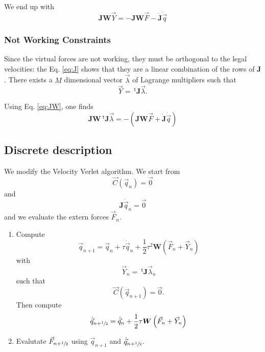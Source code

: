\documentclass[aps,twocolumn]{revtex4}
\newcommand{\mymat}[1]{\boldsymbol{#1}}
\newcommand{\mytrn}[1]{{\!\!~^{\mathsf{t}}{#1}}}
\newcommand{\half}{\sfrac{1}{2}}
\begin{document}
We end up with
\begin{equation}
\label{eq:JW}
	\mymat{J}\mymat{W}\vec{Y} = 
	-\mymat{J}\mymat{W}\vec{F} - \dot{\mymat{J}}\dot{\vec{q}}
\end{equation}

\subsubsection{Not Working Constraints}
Since the virtual forces are not working, they must be orthogonal to the legal velocities: the Eq. \eqref{eq:J}
shows that they are a linear combination of the rows of $\mymat{J}$.
There exists a $M$ dimensional vector $\vec{\lambda}$ 
of Lagrange multipliers
such that
\begin{equation}
	\vec{Y} = \mytrn{\mymat{J}}\vec{\lambda}.
\end{equation}

Using Eq. \eqref{eq:JW}, one finds
\begin{equation}
	\mymat{J}\mymat{W} \mytrn{\mymat{J}}\vec{\lambda} = -\left(\mymat{J}\mymat{W}\vec{F} + \dot{\mymat{J}}\dot{\vec{q}}\right)
\end{equation}

\subsection{Discrete description}

We modify the Velocity Verlet algorithm.
We start from
$$
	\vec{C}(\vec{q}_n)=\vec{0}  
$$
and
$$
 \mymat{J} \dot{\vec{q}}_n = \vec{0}
$$
and we evaluate the extern forces $\vec{F}_n$.

\begin{enumerate}
\item 
	Compute 
	$$
		\vec{q}_{n+1} = \vec{q}_{n} + \tau \dot{\vec{q}}_n + \dfrac{1}{2} \tau^2 \mymat{W}\left( \vec{F}_n + \vec{Y}_n\right)
	$$
	with 
	$$
		\vec{Y}_n = \mytrn{\mymat{J}}\vec{\lambda}_n
	$$
	such that
	$$
		\vec{C}(\vec{q}_{n+1}) = \vec{0}.
	$$
	Then compute
	$$
		\dot{\vec{q}}_{n+\half}  = \dot{\vec{q}}_{n} + \dfrac{1}{2} \tau  \mymat{W}\left( \vec{F}_n + \vec{Y}_n\right)
	$$
\item Evalutate $\vec{F}_{n+\half}$ using $\vec{q}_{n+1}$ and $\dot{\vec{q}}_{n+\half}$.
\end{enumerate}
\end{document}
